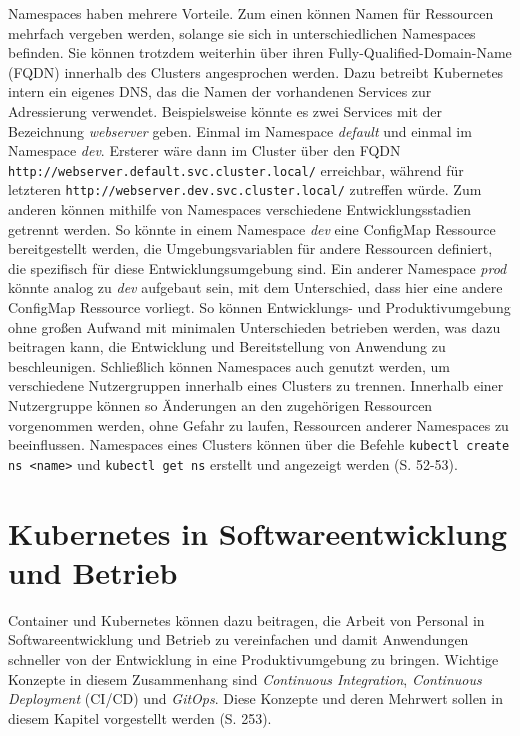 \documentclass[11pt,a4paper]{article}
\begin{document}
Namespaces haben mehrere Vorteile. Zum einen können Namen für Ressourcen mehrfach vergeben werden,
solange sie sich in unterschiedlichen Namespaces befinden. Sie können trotzdem weiterhin
über ihren Fully-Qualified-Domain-Name (FQDN) innerhalb des Clusters angesprochen werden.
Dazu betreibt Kubernetes intern ein eigenes DNS, das die Namen
der vorhandenen Services zur Adressierung verwendet.
Beispielsweise könnte es zwei Services mit der Bezeichnung \emph{webserver} geben.
Einmal im Namespace \emph{default} und einmal im Namespace \emph{dev}.
Ersterer wäre dann im Cluster über den FQDN \lstinline|http://webserver.default.svc.cluster.local/|
erreichbar, während für letzteren \lstinline|http://webserver.dev.svc.cluster.local/| zutreffen würde.
Zum anderen können mithilfe von Namespaces verschiedene Entwicklungsstadien getrennt werden.
So könnte in einem Namespace \emph{dev} eine ConfigMap Ressource bereitgestellt werden,
die Umgebungsvariablen für andere Ressourcen definiert, die spezifisch für diese
Entwicklungsumgebung sind. Ein anderer Namespace \emph{prod} könnte analog zu \emph{dev}
aufgebaut sein, mit dem Unterschied, dass hier eine andere ConfigMap Ressource vorliegt.
So können Entwicklungs- und Produktivumgebung ohne großen Aufwand mit minimalen Unterschieden betrieben
werden, was dazu beitragen kann, die Entwicklung und Bereitstellung von Anwendung zu beschleunigen.
Schließlich können Namespaces auch genutzt werden, um verschiedene Nutzergruppen innerhalb eines Clusters
zu trennen. Innerhalb einer Nutzergruppe können so Änderungen an den zugehörigen Ressourcen vorgenommen werden,
ohne Gefahr zu laufen, Ressourcen anderer Namespaces zu beeinflussen.
Namespaces eines Clusters können über die Befehle \lstinline|kubectl create ns <name>| und
\lstinline|kubectl get ns| erstellt und angezeigt werden \cite{Schmeling_Dargatz_2022} (S. 52-53).

\section{Kubernetes in Softwareentwicklung und Betrieb}
Container und Kubernetes können dazu beitragen, die Arbeit von Personal in Softwareentwicklung und
Betrieb zu vereinfachen und damit Anwendungen schneller von der Entwicklung
in eine Produktivumgebung zu bringen.
Wichtige Konzepte in diesem Zusammenhang sind
\emph{Continuous Integration}, \emph{Continuous Deployment} (CI/CD)
und \emph{GitOps}. Diese Konzepte und deren Mehrwert sollen in diesem Kapitel vorgestellt werden \cite{domingus2022cloud} (S. 253).
\end{document}
